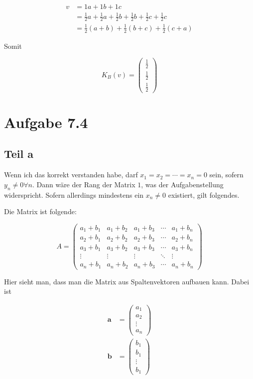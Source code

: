 \documentclass[a4paper,german,12pt,smallheadings]{scrartcl}
\begin{document}
\begin{align*}
  v &= 1a + 1b + 1c \\
    &= \frac{1}{2}a + \frac{1}{2}a + \frac{1}{2}b + \frac{1}{2}b + \frac{1}{2}c + \frac{1}{2} c \\
    &= \frac{1}{2}(a+b) + \frac{1}{2}(b+c) + \frac{1}{2}(c+a)
\end{align*}

Somit

\begin{equation*}
  K_B(v) = \begin{pmatrix} \frac{1}{2} \\ \frac{1}{2} \\ \frac{1}{2} \end{pmatrix}
\end{equation*}

\section*{Aufgabe 7.4}
\subsection*{Teil a}

Wenn ich das korrekt verstanden habe, darf $x_1 = x_2 = \dotsb = x_n = 0$ sein,
sofern $y_n \neq 0 \forall n$. Dann wäre der Rang der Matrix $1$, was der
Aufgabenstellung widerspricht. Sofern allerdings mindestens ein $x_n \neq 0$
existiert, gilt folgendes.

Die Matrix ist folgende:

\begin{equation*}
A =
  \begin{pmatrix}
    a_1 + b_1 & a_1 + b_2 & a_1 + b_3 & \dotsb & a_1 + b_n \\
    a_2 + b_1 & a_2 + b_2 & a_2 + b_3 & \dotsb & a_2 + b_n \\
    a_3 + b_1 & a_3 + b_2 & a_3 + b_3 & \dotsb & a_3 + b_n \\
    \vdots    & \vdots    & \vdots    & \ddots & \vdots \\
    a_n + b_1 & a_n + b_2 & a_n + b_3 & \dotsb & a_n + b_n
  \end{pmatrix}
\end{equation*}

Hier sieht man, dass man die Matrix aus Spaltenvektoren aufbauen kann. Dabei ist

\begin{align*}
  \mathbf{a} &= \begin{pmatrix} a_1 \\ a_2 \\ \vdots \\ a_n \end{pmatrix} \\
  \mathbf{b} &= \begin{pmatrix} b_1 \\ b_1 \\ \vdots \\ b_1 \end{pmatrix}
\end{align*}
\end{document}

